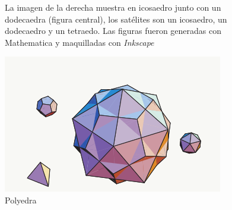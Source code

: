 \documentclass[a4paper]{article}
\begin{document}
\begin{figure}[!h]
    \begin{minipage}[b]{0.5\textwidth}  %
        La imagen de la derecha muestra en icosaedro junto con un dodecaedra (figura central), los satélites son un 
        icosaedro, un dodecaedro y un tetraedo. Las figuras fueron generadas con {\sc Mathematica} y maquilladas con 
        {\it Inkscape}
        \end{minipage}
        \hfill
        \begin{minipage}[b]{0.5\textwidth}  %
			\begin{center}
				\includegraphics[scale=0.5]{ML.png}
				\caption{Polyedra}
			\end{center}
    \end{minipage}
\end{figure}

\end{document}
